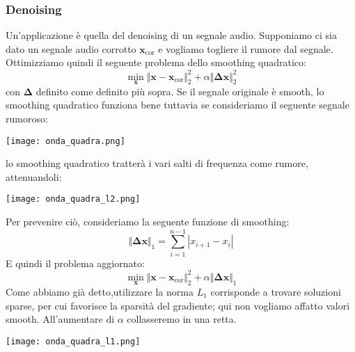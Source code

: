 \documentclass{article}
\begin{document}
            \subsubsection{Denoising}
                Un'applicazione è quella del denoising di un segnale audio. Supponiamo ci sia dato un segnale audio corrotto $\mathbf{x}_\text{cor}$ 
                e vogliamo togliere il rumore dal segnale. Ottimizziamo quindi il seguente problema dello smoothing quadratico:
                    \[ \min_\mathbf{x} \Vert \mathbf{x} - \mathbf{x}_\text{cor} \Vert_2^2 + \alpha \Vert \mathbf{\Delta x} \Vert_2^2\]
                con $\mathbf{\Delta}$ definito come definito più sopra. Se il segnale originale è smooth, lo smoothing quadratico funziona bene tuttavia 
                se consideriamo il seguente segnale rumoroso:
                \begin{center}\texttt{[image: onda\_quadra.png]}\end{center}
                lo smoothing quadratico tratterà i vari salti di frequenza come rumore, attenuandoli:
                \begin{center}\texttt{[image: onda\_quadra\_l2.png]}\end{center}
                Per prevenire ciò, consideriamo la seguente funzione di smoothing:
                \[ \Vert \mathbf{\Delta x} \Vert_1 = \sum_{i=1}^{n-1} | x_{i+1} - x_i |\]
                E quindi il problema aggiornato:
               \[ \min_\mathbf{x} \Vert \mathbf{x} - \mathbf{x}_\text{cor} \Vert_2^2 + \alpha \Vert \mathbf{\Delta x} \Vert_1\]
               Come abbiamo già detto,utilizzare la norma $L_1$ corrisponde a trovare soluzioni sparse, per cui favorisce la sparsità del
               gradiente; qui non vogliamo affatto valori smooth. All'aumentare di $\alpha$ collasseremo in una retta. 
                \begin{center}\texttt{[image: onda\_quadra\_l1.png]}\end{center}
                
\end{document}
